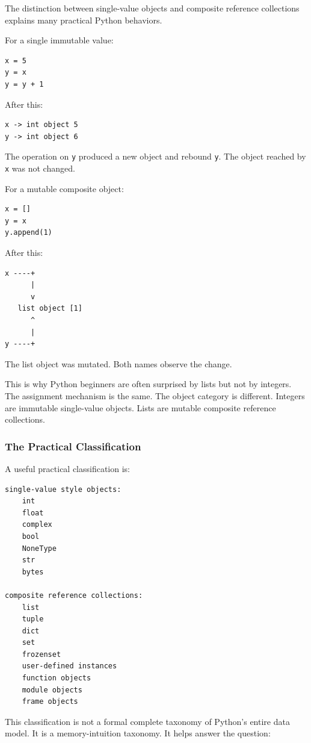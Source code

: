 The distinction between single-value objects and composite reference collections explains many practical Python behaviors.

For a single immutable value:

\begin{verbatim}
x = 5
y = x
y = y + 1
\end{verbatim}

After this:

\begin{verbatim}
x -> int object 5
y -> int object 6
\end{verbatim}

The operation on \texttt{y} produced a new object and rebound \texttt{y}. The object reached by \texttt{x} was not changed.

For a mutable composite object:

\begin{verbatim}
x = []
y = x
y.append(1)
\end{verbatim}

After this:

\begin{verbatim}
x ----+
      |
      v
   list object [1]
      ^
      |
y ----+
\end{verbatim}

The list object was mutated. Both names observe the change.

This is why Python beginners are often surprised by lists but not by integers. The assignment mechanism is the same. The object category is different. Integers are immutable single-value objects. Lists are mutable composite reference collections.

\subsubsection*{The Practical Classification}

A useful practical classification is:

\begin{verbatim}
single-value style objects:
    int
    float
    complex
    bool
    NoneType
    str
    bytes

composite reference collections:
    list
    tuple
    dict
    set
    frozenset
    user-defined instances
    function objects
    module objects
    frame objects
\end{verbatim}

This classification is not a formal complete taxonomy of Python's entire data model. It is a memory-intuition taxonomy. It helps answer the question:

